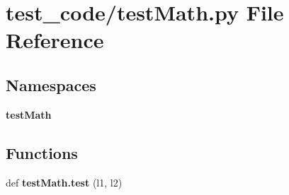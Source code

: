 \section{test\+\_\+code/test\+Math.py File Reference}
\label{test_math_8py}
\subsection*{Namespaces}
\begin{DoxyCompactItemize}
\item 
 \textbf{ test\+Math}
\end{DoxyCompactItemize}
\subsection*{Functions}
\begin{DoxyCompactItemize}
\item 
def \textbf{ test\+Math.\+test} (l1, l2)
\end{DoxyCompactItemize}
